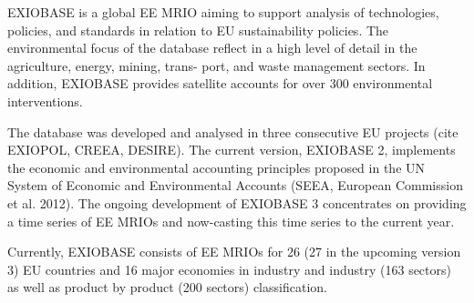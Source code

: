 EXIOBASE is a global EE MRIO aiming to support analysis of technologies,
policies, and standards in relation to EU sustainability policies. The
environmental focus of the database reflect in a high level of detail in the
agriculture, energy, mining, trans- port, and waste management sectors. In
addition, EXIOBASE provides satellite accounts for over 300 environmental
interventions.  

The database was developed and analysed in three consecutive EU projects (cite
EXIOPOL, CREEA, DESIRE). The current version, EXIOBASE 2, implements the
economic and environmental accounting principles proposed in the UN System of
Economic and Environmental Accounts (SEEA, European Commission et al. 2012).
The ongoing development of EXIOBASE 3 concentrates on providing a time series
of EE MRIOs and now-casting this time series to the current year. 

Currently, EXIOBASE consists of EE MRIOs for 26 (27 in the upcoming version 3) EU countries
and 16 major economies in industry and industry (163 sectors) as well as
product by product (200 sectors) classification.